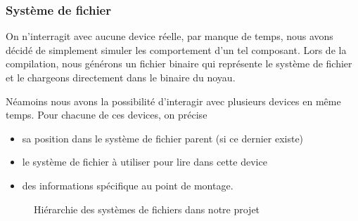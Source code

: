 \documentclass[10pt,a4paper]{beamer}
\begin{document}
\begin{frame}
  \frametitle{Système de fichier}

  On n'interragit avec aucune device réelle, par manque de temps, nous avons décidé de simplement simuler les comportement d'un tel composant. Lors de la compilation, nous générons un fichier binaire qui représente le système de fichier et le chargeons directement dans le binaire du noyau.


  Néamoins nous avons la possibilité d'interagir avec plusieurs devices en même temps. Pour chacune de ces devices, on précise
  \begin{itemize}
  \item sa position dans le système de fichier parent (si ce dernier existe)
  \item le système de fichier à utiliser pour lire dans cette device
  \item des informations spécifique au point de montage.
  \end{itemize}

  \begin{figure}
    \begin{center}
      \caption{Hiérarchie des systèmes de fichiers dans notre projet}
    \end{center}
  \end{figure}

\end{frame}
\end{document}
